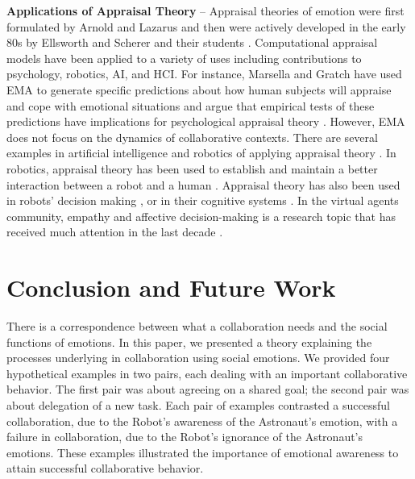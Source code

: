\textbf{Applications of Appraisal Theory} -- Appraisal theories of emotion were
first formulated by Arnold \cite{arnold:emotion-personality} and Lazarus
\cite{lazarus:emotion-adaptation} and then were actively developed in the early
80s by Ellsworth and Scherer and their students
\cite{roseman:appraisal-theory,sander:systems-approach-appraisal,scherer:nature-function-emotion,scherer:emotions-emergent,scherer:appraisal-processes}.
Computational appraisal models have been applied to a variety of uses including
contributions to psychology, robotics, AI, and HCI. For instance, Marsella and
Gratch have used EMA \cite{marsella:ema-process-model} to generate specific
predictions about how human subjects will appraise and cope with emotional
situations and argue that empirical tests of these predictions have implications
for psychological appraisal theory \cite{gratch:assessing-appraisal}. However,
EMA does not focus on the dynamics of collaborative contexts. There are several
examples in artificial intelligence and robotics of applying appraisal theory
\cite{adam:bdi-emotional-companion,kim:model-hri-appraisal,marsella:ema-process-model}.
In robotics, appraisal theory has been used to establish and maintain a better
interaction between a robot and a human
\cite{kim:model-hri-appraisal,sander:systems-approach-appraisal,vogiatzis:robot-museum}.
Appraisal theory has also been used in robots' decision making
\cite{castro:autonomous-robot-fear}, or in their cognitive systems
\cite{hudlicka:emotinos-reasons,marinier:emotion-reinforcement}. In the virtual
agents community, empathy and affective decision-making is a research topic that
has received much attention in the last decade
\cite{scott:modeling-empathy-agent,paiva:agent-care,pontier:women-robot-men,velasquez:emotions-motivations-agents}.

\section{Conclusion and Future Work}

There is a correspondence between what a collaboration needs and the social
functions of emotions. In this paper, we presented a theory explaining the
processes underlying in collaboration using social emotions. We provided four
hypothetical examples in two pairs, each dealing with an important collaborative
behavior. The first pair was about agreeing on a shared goal; the second pair
was about delegation of a new task. Each pair of examples contrasted a
successful collaboration, due to the Robot's awareness of the Astronaut's
emotion, with a failure in collaboration, due to the Robot's ignorance of the
Astronaut's emotions. These examples illustrated the importance of
emotional awareness to attain successful collaborative behavior.

